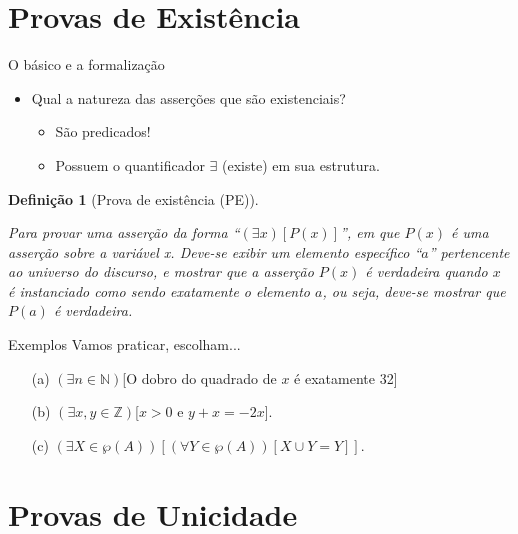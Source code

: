 \documentclass[aspectratio=169]{beamer}
\newtheorem{defi}{Definição}
\begin{document}
	\section{Provas de Existência}
	
	\begin{frame}{O básico e a formalização}
		\begin{itemize}
			\item Qual a natureza das asserções que são existenciais?\pause
			\begin{itemize}
				\item São predicados!
				\item Possuem o quantificador $\exists$ (existe) em sua estrutura.
			\end{itemize} 
		\end{itemize}
		\pause
		\begin{defi}[Prova de existência (PE)]
			\
			
			Para provar uma asserção da forma ``$(\exists x)[P(x)]$'', em que $P(x)$ é uma asserção sobre a variável x. Deve-se exibir um elemento específico ``$a$'' pertencente ao universo do discurso, e mostrar que a asserção $P(x)$ é verdadeira quando $x$ é instanciado como sendo exatamente o elemento $a$, ou seja, deve-se mostrar que $P(a)$ é verdadeira.
		\end{defi}
	\end{frame}

	\begin{frame}{Exemplos}
		Vamos praticar, escolham...
		\begin{itemize}
			\item[(a)] $(\exists n \in \mathbb{N})$[O dobro do quadrado de $x$ é exatamente 32]
			\item[(b)] $(\exists  x, y \in \mathbb{Z})$[$x > 0$ e $y + x = -2x$].
			\item[(c)] $(\exists X \in \wp(A))[(\forall Y \in \wp(A))[X \cup Y = Y]]$.
		\end{itemize}
	\end{frame}
	
	\section{Provas de Unicidade}
	
\end{document}
